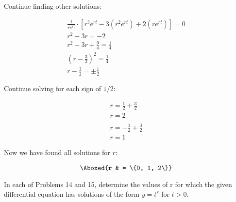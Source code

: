 \documentclass{lapchomework}
\begin{document}
\begin{problems}
\begin{solution}
\step Continue finding other solutions:

\step \begin{gather*}
\frac{1}{re^{rt}} \cdot  \left[r^3e^{rt} - 3(r^2e^{rt}) + 2(re^{rt}) \right] = 
0 \\
r^2 - 3r = -2 \\
r^2 - 3r + \frac{9}{4} = \frac{1}{4} \\
\left(r-\frac{3}{2}\right)^2 = \frac{1}{4} \\
r - \frac{3}{2} = \pm \frac{1}{2}
\end{gather*}

\step Continue solving for each sign of $1/2$:

\step \begin{gather*}
r = \frac{1}{2} + \frac{3}{2} \\
\boxed{r = 2} \\
\\
r = - \frac{1}{2} + \frac{3}{2} \\
\boxed{r = 1}
\end{gather*}

\step Now we have found all solutions for $r$:

\step \begin{align*}
\Aboxed{r & = \{0, 1, 2\}}
\end{align*}

\end{solution}

\end{problems}

\begin{instructions}
In each of Problems 14 and 15, determine the values of r for which the
given differential equation has solutions of the form $y = t^r$ for $t > 0$.
\end{instructions}
\end{document}
